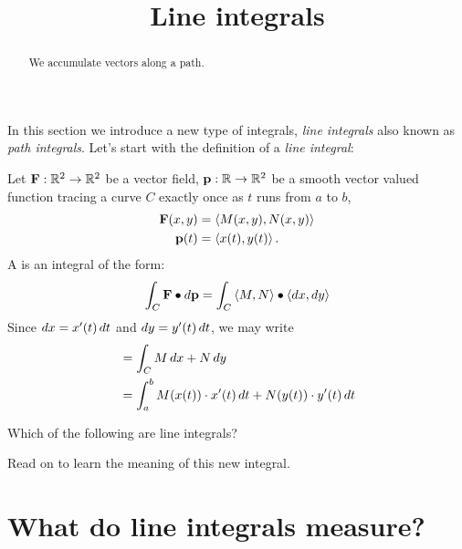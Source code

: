 \documentclass{ximera}
\title[Dig-In:]{Line integrals}
\begin{document}
\begin{abstract}
We accumulate vectors along a path.
\end{abstract}
\maketitle

In this section we introduce a new type of integrals, \textit{line
  integrals} also known as \textit{path integrals}. Let's start with
the definition of a \textit{line integral}:


\begin{definition}
Let $\mathbf{F}:\mathbb R^2\to\mathbb R^2$ be a vector field, $\mathbf{p}:\mathbb R\to\mathbb R^2$ be a
smooth vector valued function tracing a curve $C$ exactly once as $t$
runs from $a$ to $b$,
\begin{align*}
  \mathbf{F}(x,y) &= \left\langle M(x,y), N(x,y)\right\rangle\\
  \mathbf{p}(t) &= \left\langle x(t),y(t)\right\rangle.
\end{align*}
A  is an integral of the form:
\[
\int_C \mathbf{F}\bullet \mathop{}\!d \mathbf{p} = \int_C \left\langle M,N\right\rangle\bullet\left\langle \mathop{}\!d x,\mathop{}\!d y\right\rangle
\]
Since $\mathop{}\!d x = x'(t)\mathop{}\!d t$ and $\mathop{}\!d y = y'(t)\mathop{}\!d t$, we may write  
\begin{align*}
  &= \int_C M\mathop{}\!d x + N\mathop{}\!d y\\
  &= \int_a^b M(x(t))\cdot x'(t) \mathop{}\!d t + N(y(t))\cdot  y'(t) \mathop{}\!d t
\end{align*}
\end{definition}

\begin{question}
  Which of the following are line integrals?
  \begin{multipleChoice}
  \end{multipleChoice}
\end{question}

Read on to learn the meaning of this new integral.


\section{What do line integrals measure?}
\end{document}
